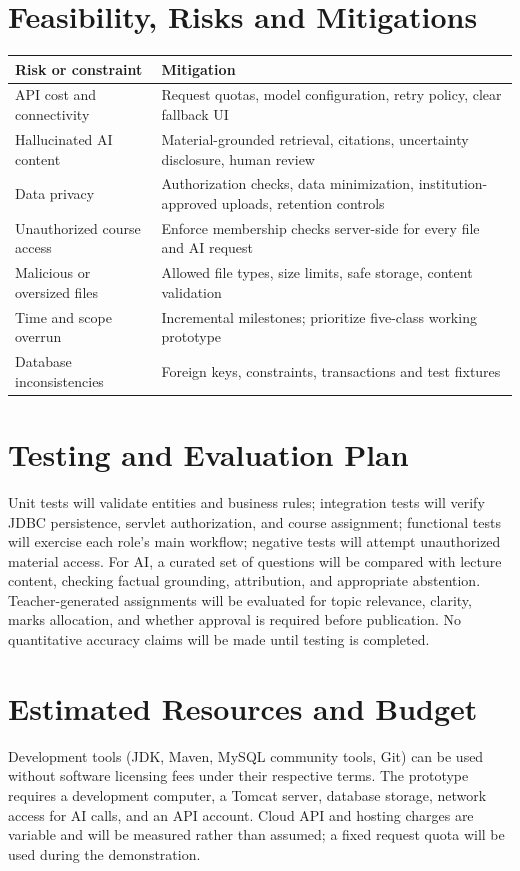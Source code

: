 \documentclass[11pt,a4paper]{article}
\begin{document}
\section{Feasibility, Risks and Mitigations}
\begin{longtable}{p{}p{}}\toprule Risk or constraint&Mitigation\\\midrule\endhead
API cost and connectivity&Request quotas, model configuration, retry policy, clear fallback UI\\Hallucinated AI content&Material-grounded retrieval, citations, uncertainty disclosure, human review\\Data privacy&Authorization checks, data minimization, institution-approved uploads, retention controls\\Unauthorized course access&Enforce membership checks server-side for every file and AI request\\Malicious or oversized files&Allowed file types, size limits, safe storage, content validation\\Time and scope overrun&Incremental milestones; prioritize five-class working prototype\\Database inconsistencies&Foreign keys, constraints, transactions and test fixtures\\\bottomrule\end{longtable}
\section{Testing and Evaluation Plan}
Unit tests will validate entities and business rules; integration tests will verify JDBC persistence, servlet authorization, and course assignment; functional tests will exercise each role's main workflow; negative tests will attempt unauthorized material access. For AI, a curated set of questions will be compared with lecture content, checking factual grounding, attribution, and appropriate abstention. Teacher-generated assignments will be evaluated for topic relevance, clarity, marks allocation, and whether approval is required before publication. No quantitative accuracy claims will be made until testing is completed.
\section{Estimated Resources and Budget}
Development tools (JDK, Maven, MySQL community tools, Git) can be used without software licensing fees under their respective terms. The prototype requires a development computer, a Tomcat server, database storage, network access for AI calls, and an API account. Cloud API and hosting charges are variable and will be measured rather than assumed; a fixed request quota will be used during the demonstration.
\end{document}
